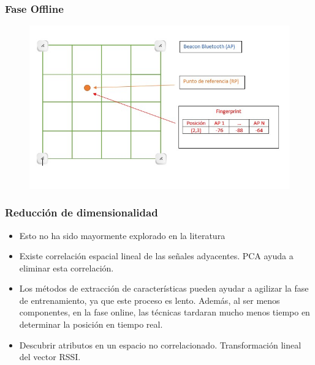 \documentclass[mathserif]{beamer}
\begin{document}

\begin{frame}
\frametitle{Fase Offline}

\begin{figure}
\includegraphics[width=\textwidth]{../figures/fingerprints.jpg}
\end{figure}

\end{frame}


\begin{frame}
\frametitle{Reducción de dimensionalidad}

\begin{itemize}

\item Esto no ha sido mayormente explorado en la literatura

\pause
\item Existe correlación espacial lineal de las señales adyacentes. PCA ayuda a eliminar esta correlación.
\pause

\item Los métodos de extracción de características pueden ayudar a agilizar la fase de entrenamiento, ya que este proceso es lento. Además, al ser menos componentes, en la fase online, las técnicas tardaran mucho menos tiempo en determinar la posición en tiempo real.

\pause

\item Descubrir atributos en un espacio no correlacionado. Transformación lineal del vector RSSI.

\end{itemize}

\end{frame}
\end{document}
